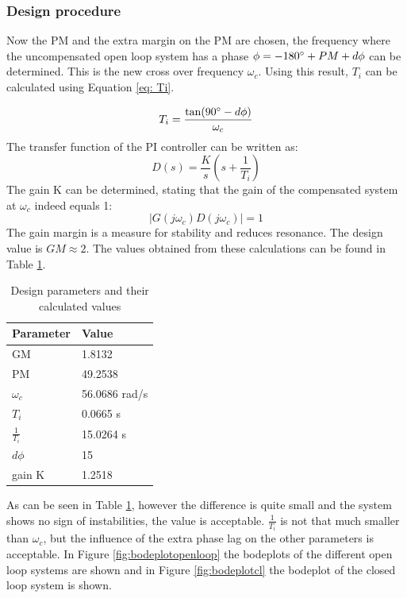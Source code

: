 \documentclass[a4paper,kul]{kulakarticle} %
\begin{document}
\subsubsection{Design procedure}
Now the PM and the extra margin on the PM are chosen, the frequency where the uncompensated open loop system has a phase $\phi = -180\degree + PM + d\phi$ can be determined. This is the new cross over frequency $\omega_c$. Using this result, $T_i$ can be calculated using Equation \ref{eq: Ti}. 

\begin{equation}
	\label{eq: Ti}
	T_i = \frac{\tan(90\degree - d\phi)}{\omega_c}
\end{equation} 
The transfer function of the PI controller can be written as:
\begin{equation}
	\label{eq: TF PI}
	D(s) = \frac{K}{s}(s+\frac{1}{T_i})
\end{equation}
The gain K can be determined, stating that the gain of the compensated system at $\omega_c$ indeed equals 1:
\begin{equation}
	|G(j\omega_c)D(j\omega_c)| = 1
\end{equation}
The gain margin is a measure for stability and reduces resonance. The design value is $GM \approx 2$. The values obtained from these calculations can be found in Table \ref{tab:values}. 

\begin{table}[htp!]
	
	\centering
	
	\begin{tabular}{|l|l|}
		\hline
		Parameter                & Value                         \\ \hline
		GM                       & 1.8132                        \\
		PM                       & 49.2538\degree \\
		$\omega_c$ & 56.0686 rad/s                 \\
		$T_i $                    & 0.0665 s                      \\
		$\frac{1}{T_i}$                    & 15.0264 s                      \\
		$d\phi$             & 15\degree      \\
		gain K 	 		& 1.2518 \\ \hline
	\end{tabular}
	\caption{Design parameters and their calculated values}
	\label{tab:values}
\end{table}
As can be seen in Table \ref{tab:values}, however the difference is quite small and the system shows no sign of instabilities, the value is acceptable. $\frac{1}{T_i}$ is not that much smaller than $\omega_c$, but the influence of the extra phase lag on the other parameters is acceptable. In Figure \ref{fig:bodeplotopenloop} the bodeplots of the different open loop systems are shown and in Figure \ref{fig:bodeplotcl} the bodeplot of the closed loop system is shown. 
\end{document}
